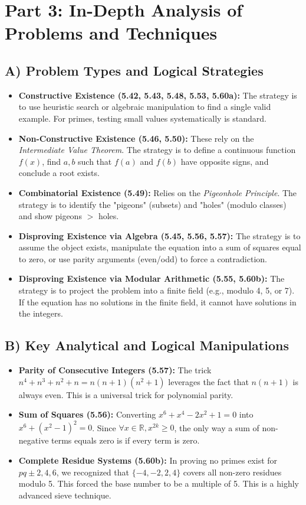 \documentclass[11pt, a4paper]{article}
\theoremstyle{definition}
\theoremstyle{remark}
\newcommand{\R}{\mathbb{R}}
\begin{document}
\newpage

\section{Part 3: In-Depth Analysis of Problems and Techniques}

\subsection{A) Problem Types and Logical Strategies}
\begin{itemize}
    \item \textbf{Constructive Existence (5.42, 5.43, 5.48, 5.53, 5.60a):} The strategy is to use heuristic search or algebraic manipulation to find a single valid example. For primes, testing small values systematically is standard.
    \item \textbf{Non-Constructive Existence (5.46, 5.50):} These rely on the \textit{Intermediate Value Theorem}. The strategy is to define a continuous function $f(x)$, find $a, b$ such that $f(a)$ and $f(b)$ have opposite signs, and conclude a root exists.
    \item \textbf{Combinatorial Existence (5.49):} Relies on the \textit{Pigeonhole Principle}. The strategy is to identify the "pigeons" (subsets) and "holes" (modulo classes) and show pigeons $>$ holes.
    \item \textbf{Disproving Existence via Algebra (5.45, 5.56, 5.57):} The strategy is to assume the object exists, manipulate the equation into a sum of squares equal to zero, or use parity arguments (even/odd) to force a contradiction.
    \item \textbf{Disproving Existence via Modular Arithmetic (5.55, 5.60b):} The strategy is to project the problem into a finite field (e.g., modulo 4, 5, or 7). If the equation has no solutions in the finite field, it cannot have solutions in the integers.
\end{itemize}

\subsection{B) Key Analytical and Logical Manipulations}
\begin{itemize}
    \item \textbf{Parity of Consecutive Integers (5.57):} The trick $n^4+n^3+n^2+n = n(n+1)(n^2+1)$ leverages the fact that $n(n+1)$ is always even. This is a universal trick for polynomial parity.
    \item \textbf{Sum of Squares (5.56):} Converting $x^6+x^4-2x^2+1=0$ into $x^6 + (x^2-1)^2 = 0$. Since $\forall x \in \R, x^{2k} \ge 0$, the only way a sum of non-negative terms equals zero is if every term is zero.
    \item \textbf{Complete Residue Systems (5.60b):} In proving no primes exist for $pq \pm 2, 4, 6$, we recognized that $\{-4, -2, 2, 4\}$ covers all non-zero residues modulo 5. This forced the base number to be a multiple of 5. This is a highly advanced sieve technique.
\end{itemize}
\end{document}
